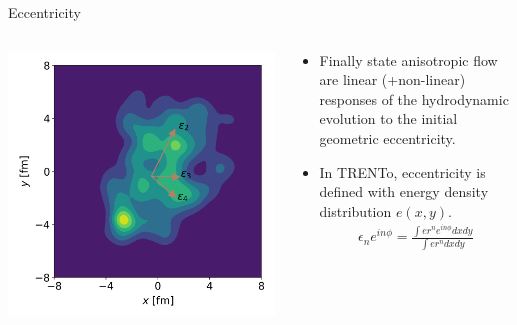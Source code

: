\documentclass[11pt, aspectratio=169]{beamer}
\begin{document}
\begin{frame}{Eccentricity}
\begin{columns}
\begin{column}{.4\textwidth}
\includegraphics[width=\textwidth]{trento_demo.png}
\end{column}
\begin{column}{.6\textwidth}
\begin{itemize}
\item Finally state anisotropic flow are linear (+non-linear) responses of the hydrodynamic evolution to the initial geometric eccentricity.
\item In TRENTo, eccentricity is defined with energy density distribution $e(x, y)$.
\begin{eqnarray}
\nonumber
\epsilon_n e^{i n\phi} = \frac{\int e r^n e^{i n \phi}dx dy}{\int e r^n dx dy}
\end{eqnarray}
\end{itemize}
\end{column}
\end{columns}
\end{frame}
\end{document}
